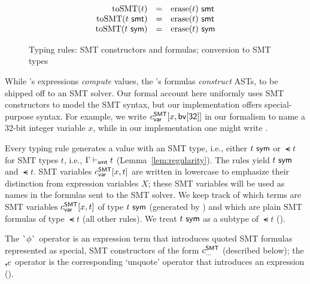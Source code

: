\documentclass[acmsmall,screen,nonacm]{acmart}
\theoremstyle{definition}
\begin{document}
\begin{figure}[pt]
  \sidebyside[.45][.45][t]
  {\[\begin{array}{rcl}
      \erase(B) &=& B \\
      \erase(D ~ \vec{\tau_i}) &=& D ~ \overrightarrow{\erase(\tau_i)} \\
      \erase(\smt{t}) &=& \erase(t) \\
      \erase(\sym{t}) &=& \erase(t) \\
    \end{array}\]}
  {\[\begin{array}{rcl}
      \mathrm{toSMT}(t) &=& {\mathrm{erase}(t)} ~ \mathsf{smt} \\
      \mathrm{toSMT}({t} ~ \mathsf{smt}) &=& {\mathrm{erase}(t)} ~ \mathsf{smt} \\
      \mathrm{toSMT}({t} ~ \mathsf{sym}) &=& {\mathrm{erase}(t)} ~ \mathsf{sym} \\
    \end{array}\]}

  \caption{Typing rules: SMT constructors and formulas; conversion to SMT types}
  \label{fig:types-formulas}
\end{figure}

While \Name's expressions \emph{compute} values, the \Name's
formulas \emph{construct} ASTs, to be shipped off to an SMT solver.
%
Our formal account here uniformly uses SMT constructors to model the
SMT syntax, but our implementation offers special-purpose syntax.
%
For example, we write $c^\mathsf{SMT}_{\mathsf{var}}[x,\mathsf{bv[32]}]$ in our formalism to name a 32-bit
integer variable $x$, while in our implementation one might write
.

Every \rn{$\phi$-$\dots$} typing rule generates a value with an SMT
type, i.e., either ${t} ~ \mathsf{sym}$ or $\smt{t}$ for SMT types $t$, i.e.,
$\Gamma \vdash_{\mathsf{smt}} t$ (Lemma~\ref{lem:regularity}). The
 rules yield ${t} ~ \mathsf{sym}$ and $\smt{t}$.
%
SMT variables $c^\mathsf{SMT}_{\mathsf{var}}[x,t]$ are written in lowercase to emphasize
their distinction from expression variables $X$; these SMT variables
will be used as names in the formulas sent to the SMT solver.
%
We keep track of which terms are SMT variables $c^\mathsf{SMT}_{\mathsf{var}}[x,t]$ of
type ${t} ~ \mathsf{sym}$ (generated by ) and which are plain SMT
formulas of type $\smt{t}$ (all other rules). We treat ${t} ~ \mathsf{sym}$ as a
subtype of $\smt{t}$ ().

The $\textsf{\`{}}{\phi}\textsf{\`{}}$ operator is an expression term that introduces
quoted SMT formulas represented as special, SMT constructors of the
form $c^\mathsf{SMT}_{\mathsf{...}}$ (described below); the $\textbf{,}{e}$ operator is the corresponding
`unquote' operator that introduces an expression
().
\end{document}
